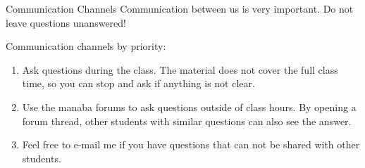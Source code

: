 \documentclass[aspectratio=169]{beamer}
\begin{document}
\begin{CJK}{UTF8}{ipxm}


\begin{frame}[t]{Communication Channels}{}
  Communication between us is very important. Do not leave questions unanswered!\bigskip

  Communication channels by priority:
  \begin{enumerate}
  \item Ask questions during the class. The material does not cover
    the full class time, so you can stop and ask if anything is not
    clear.
  \item Use the manaba forums to ask questions outside of class
    hours. By opening a forum thread, other students with similar
    questions can also see the answer.
  \item Feel free to e-mail me if you have questions that can not be
    shared with other students.
  \end{enumerate}\bigskip


\end{frame}
\end{CJK}
\end{document}
